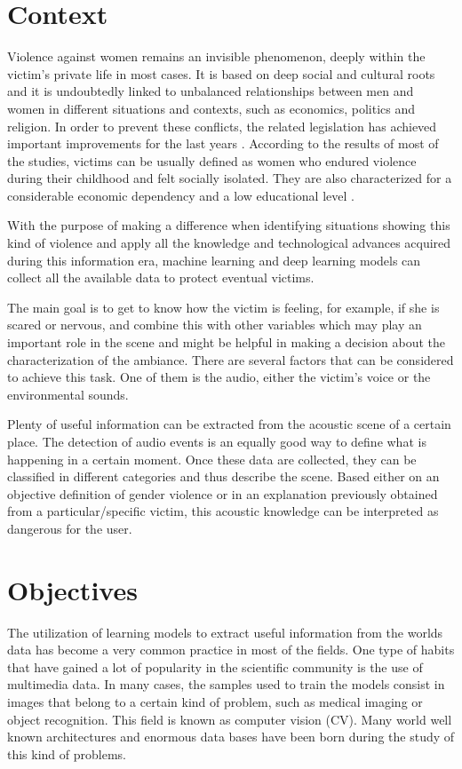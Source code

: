 \section{Context}
	Violence against women remains an invisible phenomenon, deeply within the victim’s private life in most cases. It is based on deep social and cultural roots and it is undoubtedly linked to unbalanced relationships between men and women in different situations and contexts, such as economics, politics and religion. In order to prevent these conflicts, the related legislation has achieved important improvements for the last years \cite{}. According to the results of most of the studies, victims can be usually defined as women who endured violence during their childhood and felt socially isolated. They are also characterized for a considerable economic dependency and a low educational level \cite{}.

	With the purpose of making a difference when identifying situations showing this kind of violence and apply all the knowledge and technological advances acquired during this information era, machine learning and deep learning models can collect all the available data to protect eventual victims.
	
	The main goal is to get to know how the victim is feeling, for example, if she is scared or nervous, and combine this with other variables which may play an important role in the scene and might be helpful in making a decision about the characterization of the ambiance. There are several factors that can be considered to achieve this task. One of them is the audio, either the victim's voice or the environmental sounds.
	
	Plenty of useful information can be extracted from the acoustic scene of a certain place. The detection of audio events is an equally good way to define what is happening in a certain moment. Once these data are collected, they can be classified in different categories and thus describe the scene. Based either on an objective definition of gender violence or in an explanation previously obtained from a particular/specific victim, this acoustic knowledge can be interpreted as dangerous for the user.

	
\section{Objectives}
	The utilization of learning models to extract useful information from the worlds data has become a very common practice in most of the fields. One type of habits that have gained a lot of popularity in the scientific community is the use of multimedia data. In many cases, the samples used to train the models consist in images that belong to a certain kind of problem, such as medical imaging or object recognition. This field is known as computer vision (CV). Many world well known architectures and enormous data bases have been born during the study of this kind of problems.
	
